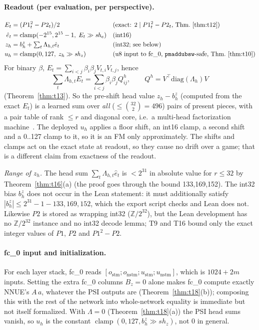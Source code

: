 \documentclass[10pt]{article}
\newcommand{\Z}{\mathbb{Z}}
\newcommand{\Zm}[1]{\Z/2^{#1}}
\DeclareMathOperator{\clamp}{clamp}
\theoremstyle{plain}
\theoremstyle{definition}
\begin{document}
\paragraph{Readout (per evaluation, per perspective).}
\begin{align*}
E_t&=(P1_t^2-P2_t)/2 &&\text{(exact: $2\mid P1_t^2-P2_t$, Thm.~\ref{thm:t12})}\\
\hat e_t&=\clamp(-2^{15},2^{15}-1,\;E_t\gg\mathit{sh}_e)&&\text{(int16)}\\
z_h&=b^z_h+\textstyle\sum_t\Lambda_{h,t}\hat e_t&&\text{(int32; see below)}\\
u_h&=\clamp(0,127,\;z_h\gg\mathit{sh}_z)&&\text{(u8 input to fc\_0, \texttt{pmaddubsw}-safe, Thm.~\ref{thm:t10})}
\end{align*}
For binary $\beta$, $E_t=\sum_{i<j}\beta_i\beta_jV_{t,i}V_{t,j}$, hence
\[
\sum_t\Lambda_{h,t}E_t=\sum_{i<j}\beta_i\beta_jQ^h_{ij},\qquad Q^h=V^\top\mathrm{diag}(\Lambda_h)V
\]
(Theorem~\ref{thm:t13}).
So the pre-shift head value $z_h-b^z_h$ (computed from the exact $E_t$) is a learned sum over \emph{all} ($\le\binom{32}{2}=496$) pairs of present pieces, with a pair table of rank $\le r$ and diagonal core, i.e.\ a multi-head factorization machine~\cite{rendle2010}.
The deployed $u_h$ applies a floor shift, an int16 clamp, a second shift and a 0..127 clamp to it, so it is an FM only approximately.
The shifts and clamps act on the exact state at readout, so they cause no drift over a game; that is a different claim from exactness of the readout.

\emph{Range of $z_h$.} The head sum $\sum_t\Lambda_{h,t}\hat e_t$ is $<2^{31}$ in absolute value for $r\le32$ by Theorem~\ref{thm:t16}(a) (the proof goes through the bound 133,169,152).
The int32 bias $b^z_h$ does not occur in the Lean statement: it must additionally satisfy $|b^z_h|\le2^{31}-1-133{,}169{,}152$, which the export script checks and Lean does not.
Likewise $P2$ is stored as wrapping int32 ($\Zm{32}$), but the Lean development has no $\Zm{32}$ instance and no int32 decode lemma; T9 and T16 bound only the exact integer values of $P1$, $P2$ and $P1^2-P2$.

\paragraph{fc\_0 input and initialization.}
For each layer stack, fc\_0 reads $[o_{\mathrm{stm}};o_{\mathrm{nstm}};u_{\mathrm{stm}};u_{\mathrm{nstm}}]$, which is $1024+2m$ inputs.
Setting the extra fc\_0 columns $B_z=0$ alone makes fc\_0 compute exactly NNUE's $A\,a$, whatever the PSI outputs are (Theorem~\ref{thm:t18}(b)); composing this with the rest of the network into whole-network equality is immediate but not itself formalized.
With $\Lambda=0$ (Theorem~\ref{thm:t18}(a)) the PSI head sums vanish, so $u_h$ is the constant $\clamp(0,127,b^z_h\gg\mathit{sh}_z)$, not $0$ in general.
\end{document}
